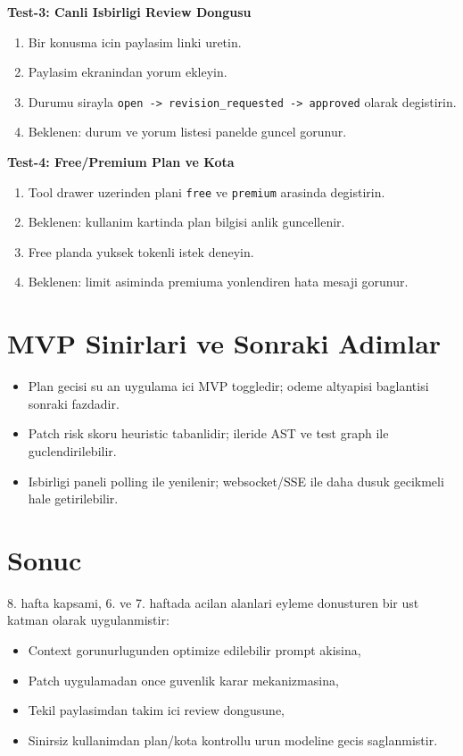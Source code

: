 \documentclass[12pt,a4paper]{article}
\begin{document}
\textbf{Test-3: Canli Isbirligi Review Dongusu}
\begin{enumerate}[leftmargin=*]
  \item Bir konusma icin paylasim linki uretin.
  \item Paylasim ekranindan yorum ekleyin.
  \item Durumu sirayla \texttt{open -> revision\_requested -> approved} olarak degistirin.
  \item Beklenen: durum ve yorum listesi panelde guncel gorunur.
\end{enumerate}

\textbf{Test-4: Free/Premium Plan ve Kota}
\begin{enumerate}[leftmargin=*]
  \item Tool drawer uzerinden plani \texttt{free} ve \texttt{premium} arasinda degistirin.
  \item Beklenen: kullanim kartinda plan bilgisi anlik guncellenir.
  \item Free planda yuksek tokenli istek deneyin.
  \item Beklenen: limit asiminda premiuma yonlendiren hata mesaji gorunur.
\end{enumerate}

\section{MVP Sinirlari ve Sonraki Adimlar}
\begin{itemize}[leftmargin=*]
  \item Plan gecisi su an uygulama ici MVP toggledir; odeme altyapisi baglantisi sonraki fazdadir.
  \item Patch risk skoru heuristic tabanlidir; ileride AST ve test graph ile guclendirilebilir.
  \item Isbirligi paneli polling ile yenilenir; websocket/SSE ile daha dusuk gecikmeli hale getirilebilir.
\end{itemize}

\section{Sonuc}
8. hafta kapsami, 6. ve 7. haftada acilan alanlari eyleme donusturen bir ust katman olarak uygulanmistir:

\begin{itemize}[leftmargin=*]
  \item Context gorunurlugunden optimize edilebilir prompt akisina,
  \item Patch uygulamadan once guvenlik karar mekanizmasina,
  \item Tekil paylasimdan takim ici review dongusune,
  \item Sinirsiz kullanimdan plan/kota kontrollu urun modeline gecis saglanmistir.
\end{itemize}
\end{document}
